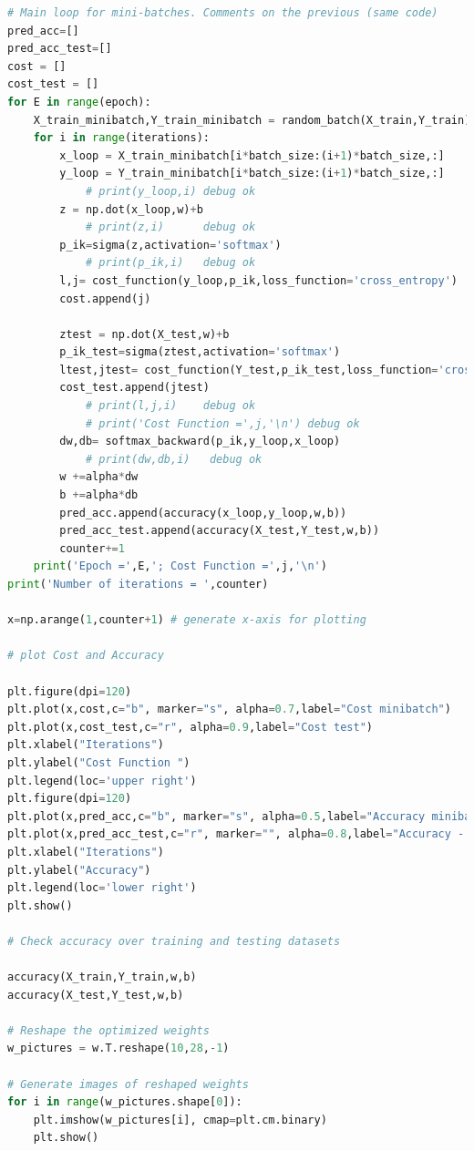 \documentclass{article}
\begin{document}
\begin{lstlisting}[language=Python]
# Main loop for mini-batches. Comments on the previous (same code)
pred_acc=[]
pred_acc_test=[]
cost = []
cost_test = []
for E in range(epoch):
    X_train_minibatch,Y_train_minibatch = random_batch(X_train,Y_train)
    for i in range(iterations):
        x_loop = X_train_minibatch[i*batch_size:(i+1)*batch_size,:]
        y_loop = Y_train_minibatch[i*batch_size:(i+1)*batch_size,:]
            # print(y_loop,i) debug ok
        z = np.dot(x_loop,w)+b
            # print(z,i)      debug ok 
        p_ik=sigma(z,activation='softmax')
            # print(p_ik,i)   debug ok
        l,j= cost_function(y_loop,p_ik,loss_function='cross_entropy')
        cost.append(j)
        
        ztest = np.dot(X_test,w)+b
        p_ik_test=sigma(ztest,activation='softmax')
        ltest,jtest= cost_function(Y_test,p_ik_test,loss_function='cross_entropy')
        cost_test.append(jtest)
            # print(l,j,i)    debug ok
            # print('Cost Function =',j,'\n') debug ok
        dw,db= softmax_backward(p_ik,y_loop,x_loop)
            # print(dw,db,i)   debug ok
        w +=alpha*dw
        b +=alpha*db
        pred_acc.append(accuracy(x_loop,y_loop,w,b))
        pred_acc_test.append(accuracy(X_test,Y_test,w,b))
        counter+=1
    print('Epoch =',E,'; Cost Function =',j,'\n')
print('Number of iterations = ',counter)

x=np.arange(1,counter+1) # generate x-axis for plotting

# plot Cost and Accuracy 

plt.figure(dpi=120)
plt.plot(x,cost,c="b", marker="s", alpha=0.7,label="Cost minibatch")
plt.plot(x,cost_test,c="r", alpha=0.9,label="Cost test")
plt.xlabel("Iterations")
plt.ylabel("Cost Function ")
plt.legend(loc='upper right')
plt.figure(dpi=120)
plt.plot(x,pred_acc,c="b", marker="s", alpha=0.5,label="Accuracy minibatch Train")
plt.plot(x,pred_acc_test,c="r", marker="", alpha=0.8,label="Accuracy - Test")
plt.xlabel("Iterations")
plt.ylabel("Accuracy")
plt.legend(loc='lower right')
plt.show()

# Check accuracy over training and testing datasets

accuracy(X_train,Y_train,w,b)
accuracy(X_test,Y_test,w,b)

# Reshape the optimized weights
w_pictures = w.T.reshape(10,28,-1)

# Generate images of reshaped weights
for i in range(w_pictures.shape[0]):
    plt.imshow(w_pictures[i], cmap=plt.cm.binary)
    plt.show()
\end{lstlisting}
\end{document}
